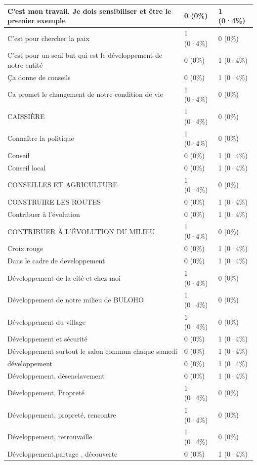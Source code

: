 \documentclass[
]{book}
\begin{document}
\begin{tabular}{l|l|l}
\hline
C'est mon travail. Je dois sensibiliser et être le premier exemple & 0 (0\%) & 1 (0·4\%)\\
\hline
C'est pour chercher la paix & 1 (0·4\%) & 0 (0\%)\\
\hline
C'est pour un seul but qui est le développement de notre entité & 0 (0\%) & 1 (0·4\%)\\
\hline
Ça donne de conseils & 0 (0\%) & 1 (0·4\%)\\
\hline
Ca promet le changement de notre condition de vie & 1 (0·4\%) & 0 (0\%)\\
\hline
CAISSIÈRE & 1 (0·4\%) & 0 (0\%)\\
\hline
Connaître la politique & 1 (0·4\%) & 0 (0\%)\\
\hline
Conseil & 0 (0\%) & 1 (0·4\%)\\
\hline
Conseil local & 0 (0\%) & 1 (0·4\%)\\
\hline
CONSEILLES ET AGRICULTURE & 1 (0·4\%) & 0 (0\%)\\
\hline
CONSTRUIRE LES ROUTES & 0 (0\%) & 1 (0·4\%)\\
\hline
Contribuer à l'évolution & 0 (0\%) & 1 (0·4\%)\\
\hline
CONTRIBUER À L'ÉVOLUTION DU MILIEU & 1 (0·4\%) & 0 (0\%)\\
\hline
Croix rouge & 0 (0\%) & 1 (0·4\%)\\
\hline
Dans le cadre de developpement & 0 (0\%) & 1 (0·4\%)\\
\hline
Développement de la cité et chez moi & 1 (0·4\%) & 0 (0\%)\\
\hline
Développement de notre milieu de BULOHO & 1 (0·4\%) & 0 (0\%)\\
\hline
Développement du village & 1 (0·4\%) & 0 (0\%)\\
\hline
Développement et sécurité & 0 (0\%) & 1 (0·4\%)\\
\hline
Développement surtout le salon commun chaque samedi & 0 (0\%) & 1 (0·4\%)\\
\hline
développement & 0 (0\%) & 1 (0·4\%)\\
\hline
Développement, désenclavement & 0 (0\%) & 1 (0·4\%)\\
\hline
Développement, Propreté & 1 (0·4\%) & 0 (0\%)\\
\hline
Développement, propreté, rencontre & 1 (0·4\%) & 0 (0\%)\\
\hline
Développement, retrouvaille & 1 (0·4\%) & 0 (0\%)\\
\hline
Développement,partage , découverte & 0 (0\%) & 1 (0·4\%)\\

\end{tabular}
\end{document}
